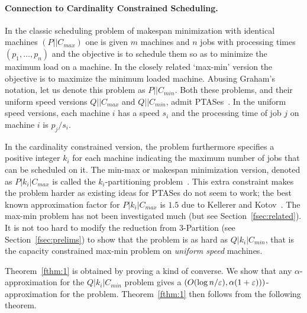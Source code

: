 \paragraph{Connection to Cardinality Constrained Scheduling.}
In the classic scheduling problem of makespan minimization with identical machines $(P||C_{max})$ one is given $m$ machines and $n$ jobs with processing times $(p_1,\ldots,p_n)$	and the objective is to schedule them so as to minimize the maximum load on a machine.
In the closely related `max-min' version the objective is to maximize the minimum loaded machine. Abusing Graham's notation, let us denote this problem as $P||C_{min}$.
Both these problems, and their uniform speed versions $Q||C_{max}$ and $Q||C_{min}$, admit PTASes~\cite{bibid}. In the uniform speed versions, each machine $i$  has a speed $s_i$ and the processing time of job $j$ on machine $i$ is $p_j/s_i$.

In the cardinality constrained version, the problem furthermore specifies a positive integer $k_i$ for each machine indicating the maximum number of jobs that can be scheduled on it. The min-max or makespan minimization version, denoted as $P|k_i|C_{max}$ is called the $k_i$-partitioning problem~\cite{bibid}.  This extra constraint makes the problem harder as existing ideas for PTASes do not seem to work; the best known approximation factor for $P|k_i|C_{max}$ is $1.5$ due to Kellerer and Kotov~\cite{KK11}.
The max-min problem has not been investigated much (but see Section~\ref{fsec:related}).
It is not too hard to modify the reduction from $3$-Partition (see Section~\ref{fsec:prelims}) to show that the \mckc problem is as hard as $Q|k_i|C_{min}$, that is the capacity constrained max-min problem on {\em uniform speed} machines.

Theorem~\ref{fthm:1} is obtained by proving a kind of converse. We show that any $\alpha$-approximation for the $Q|k_i|C_{min}$ problem gives a $\left(O(\log n/\varepsilon), \alpha(1+\varepsilon))\right)$-approximation for the \mckc problem.
Theorem~\ref{fthm:1} then follows from the following theorem.\fi
%



